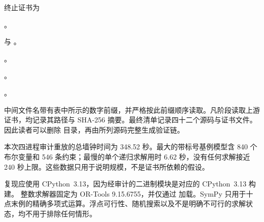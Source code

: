 终止证书为
{\raggedright
\begin{description}[style=nextline,leftmargin=2.8em]
\item[$n=9$] 。
\item[$n=10$]  与
  。
\item[$n=11$] 。
\item[$n=12$] 。
\item[$n=13,14$] 。
\end{description}
\par}
中间文件名带有表中所示的数字前缀，并严格按此前缀顺序读取。凡阶段读取上游证书，均记录其路径与 SHA-256 摘要。最终清单记录四十二个源码与证书文件。因此读者可以删除
 目录，再由所列源码完整生成验证链。

本次四进程审计重放的总墙钟时间为 348.52 秒。最大的带标号基例模型含 840 个
布尔变量和 546 条约束；最慢的单个递归求解用时 6.62 秒，没有任何求解接近
240 秒上限。这些数据只用于说明规模，不是证书所依赖的假设。

复现应使用 CPython~3.13，因为经审计的二进制模块是对应的 CPython~3.13 构建。
整数求解器固定为 OR-Tools 9.15.6755，并仅通过
 加载。SymPy 只用于十点末例的精确多项式运算。浮点可行性、随机搜索以及不是明确不可行的求解状态，均不用于排除任何情形。
